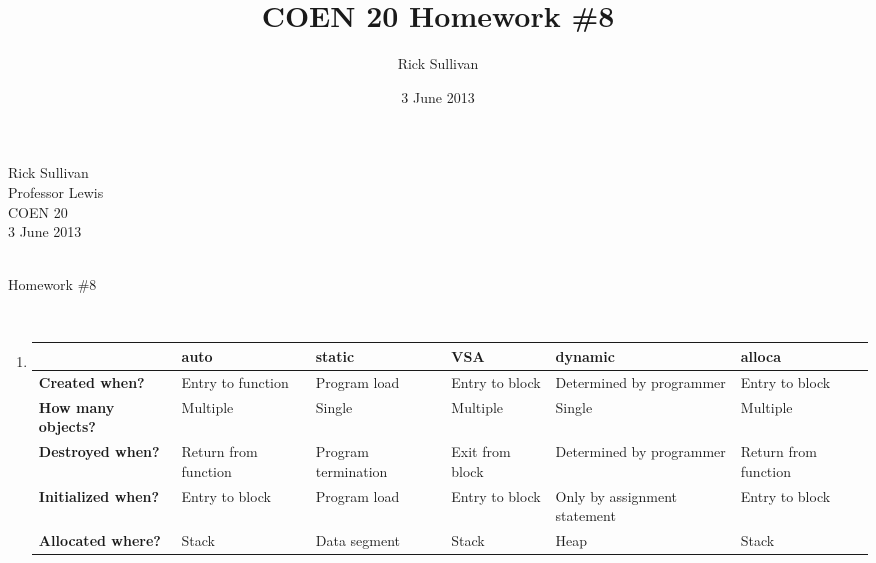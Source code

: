 \documentclass[11pt]{article}
\title{COEN 20 Homework \#8}
\date{3 June 2013}
\author{Rick Sullivan}
\begin{document}
\noindent Rick Sullivan     \\
          Professor Lewis   \\
          COEN 20           \\
          3 June 2013        \\
                            \\
\centerline {Homework \#8}    \\
\begin{enumerate}
    \item
        \begin{tabular*}{.87\textwidth}{p{} || Y | Y | Y | Y | Y @{\extracolsep{\fill}}|}
        & auto & static & VSA & dynamic & alloca    \\ \hline

        \textbf{Created when?} & Entry to function & Program load & 
        Entry to block & Determined by programmer & Entry to block \\ \hline

        \textbf{How many objects?} & Multiple & Single & 
        Multiple & Single & Multiple \\ \hline

        \textbf{Destroyed when?} & Return from function & Program termination & 
        Exit from block & Determined by programmer & Return from function \\ \hline

        \textbf{Initialized when?} & Entry to block & Program load &
        Entry to block & Only by assignment statement & Entry to block \\ \hline

        \textbf{Allocated where?} & Stack & Data segment &
        Stack & Heap & Stack   \\ \hline
        \end{tabular*}
        \\  \\


\end{enumerate}
\end{document}
